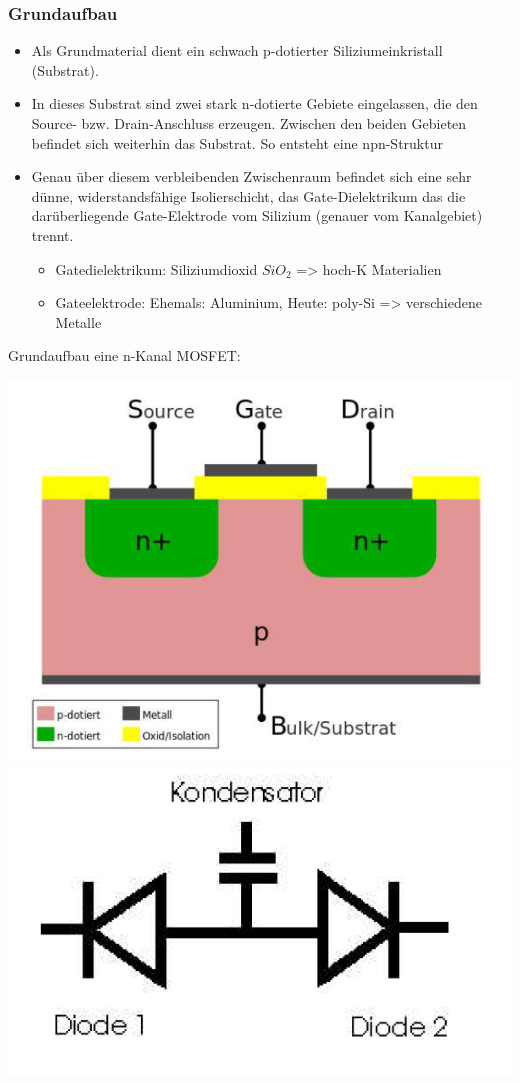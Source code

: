 	\subsubsection{Grundaufbau}	
		
	\begin{itemize}
		\item Als Grundmaterial dient ein schwach p-dotierter Siliziumeinkristall (Substrat).
		\item In dieses Substrat sind zwei stark n-dotierte Gebiete eingelassen, die den Source- bzw. Drain-Anschluss erzeugen. Zwischen den beiden Gebieten befindet sich weiterhin
		das Substrat. So entsteht eine npn-Struktur
		\item Genau über diesem verbleibenden Zwischenraum befindet sich eine sehr dünne, widerstandsfähige Isolierschicht, das Gate-Dielektrikum das die darüberliegende Gate-Elektrode vom Silizium (genauer vom Kanalgebiet) trennt.
			\begin{itemize}
				\item Gatedielektrikum: Siliziumdioxid $SiO_2$ => hoch-K Materialien
				\item Gateelektrode: Ehemals: Aluminium, Heute: poly-Si => verschiedene Metalle
			\end{itemize}
	\end{itemize}
	Grundaufbau eine n-Kanal MOSFET:
	\begin{center}
		\includegraphics[width=0.5\linewidth]{Kapitel/Kap06/MOS_Transistor.png}
		\includegraphics[width=0.2\linewidth]{Kapitel/Kap06/DiodenbildMOS}			
	\end{center}


